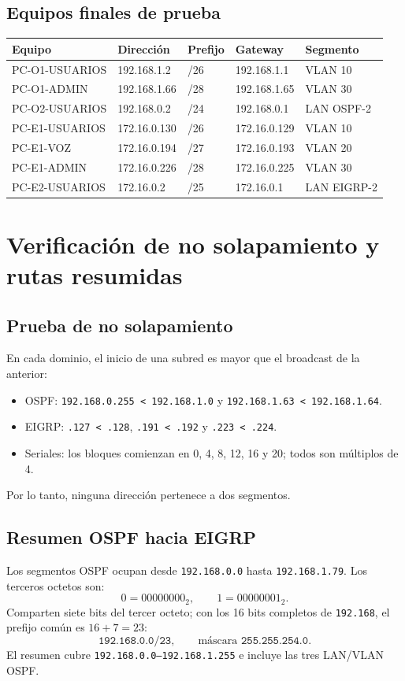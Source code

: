 \documentclass[11pt]{article}
\begin{document}
\subsection{Equipos finales de prueba}
\begin{longtable}{p{3.3cm}p{2.8cm}p{2.1cm}p{2.8cm}p{2.4cm}}
\toprule
Equipo & Dirección & Prefijo & Gateway & Segmento\\
\midrule
\endhead
PC-O1-USUARIOS & 192.168.1.2 & /26 & 192.168.1.1 & VLAN 10\\
PC-O1-ADMIN & 192.168.1.66 & /28 & 192.168.1.65 & VLAN 30\\
PC-O2-USUARIOS & 192.168.0.2 & /24 & 192.168.0.1 & LAN OSPF-2\\
PC-E1-USUARIOS & 172.16.0.130 & /26 & 172.16.0.129 & VLAN 10\\
PC-E1-VOZ & 172.16.0.194 & /27 & 172.16.0.193 & VLAN 20\\
PC-E1-ADMIN & 172.16.0.226 & /28 & 172.16.0.225 & VLAN 30\\
PC-E2-USUARIOS & 172.16.0.2 & /25 & 172.16.0.1 & LAN EIGRP-2\\
\bottomrule
\end{longtable}
\normalsize

\section{Verificación de no solapamiento y rutas resumidas}

\subsection{Prueba de no solapamiento}
En cada dominio, el inicio de una subred es mayor que el broadcast de la anterior:
\begin{itemize}
\item OSPF: \texttt{192.168.0.255 < 192.168.1.0} y \texttt{192.168.1.63 < 192.168.1.64}.
\item EIGRP: \texttt{.127 < .128}, \texttt{.191 < .192} y \texttt{.223 < .224}.
\item Seriales: los bloques comienzan en 0, 4, 8, 12, 16 y 20; todos son múltiplos de 4.
\end{itemize}
Por lo tanto, ninguna dirección pertenece a dos segmentos.

\subsection{Resumen OSPF hacia EIGRP}
Los segmentos OSPF ocupan desde \texttt{192.168.0.0} hasta \texttt{192.168.1.79}. Los terceros octetos son:
\[
0=00000000_2,\qquad 1=00000001_2.
\]
Comparten siete bits del tercer octeto; con los 16 bits completos de \texttt{192.168}, el prefijo común es $16+7=23$:
\[
\boxed{\texttt{192.168.0.0/23}},\qquad
\text{máscara }\texttt{255.255.254.0}.
\]
El resumen cubre \texttt{192.168.0.0--192.168.1.255} e incluye las tres LAN/VLAN OSPF.
\end{document}
